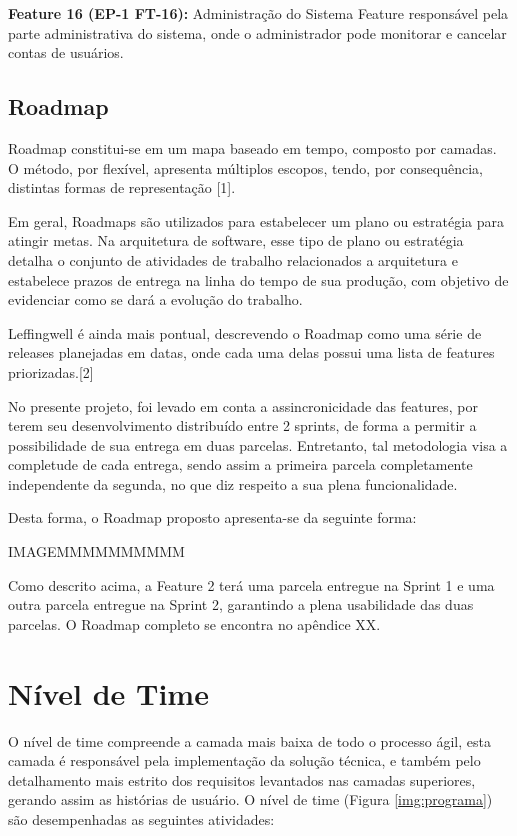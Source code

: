 \textbf{Feature 16 (EP-1 FT-16):} Administração do Sistema
Feature responsável pela parte administrativa do sistema, onde o administrador pode monitorar e cancelar contas de usuários.

\subsection{Roadmap}

Roadmap constitui-se em um mapa baseado em tempo, composto por camadas. O método, por flexível, apresenta múltiplos escopos, tendo, por consequência, distintas formas de representação [1].

Em geral, Roadmaps são utilizados para estabelecer um plano ou estratégia para atingir metas. Na arquitetura de software, esse tipo de plano ou estratégia detalha o conjunto de atividades de trabalho relacionados a arquitetura e estabelece prazos de entrega na linha do tempo de sua produção, com objetivo de evidenciar como se dará a evolução do trabalho.

Leffingwell é ainda mais pontual, descrevendo o Roadmap como uma série de releases planejadas em datas, onde cada uma delas possui uma lista de features priorizadas.[2]

No presente projeto, foi levado em conta a assincronicidade das features, por terem seu desenvolvimento distribuído entre 2 sprints, de forma a permitir a possibilidade de sua entrega em duas parcelas. Entretanto, tal metodologia visa a completude de cada entrega, sendo assim a primeira parcela completamente independente da segunda, no que diz respeito a sua plena funcionalidade.

Desta forma, o Roadmap proposto apresenta-se da seguinte forma:

IMAGEMMMMMMMMMM

Como descrito acima, a Feature 2 terá uma parcela entregue na Sprint 1 e uma outra parcela entregue na Sprint 2, garantindo a plena usabilidade das duas parcelas.
O Roadmap completo se encontra no apêndice XX.

\section{Nível de Time}

O nível de time compreende a camada mais baixa de todo o processo ágil, esta camada é responsável pela implementação da solução técnica, e também pelo detalhamento mais estrito dos requisitos levantados nas camadas superiores, gerando assim as histórias de usuário. O nível de time (Figura \ref{img:programa}) são desempenhadas as seguintes atividades:

